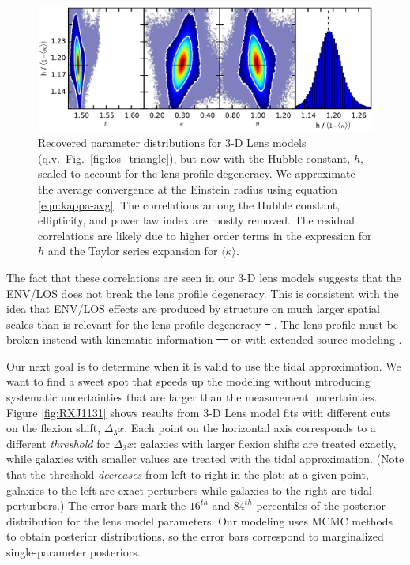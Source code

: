 \documentclass{emulateapj}
\providecommand{\DIFaddtex}[1]{{\protect\color{blue}\uwave{#1}}} %
\providecommand{\DIFdeltex}[1]{{\protect\color{red}\sout{#1}}}                      %
\providecommand{\DIFaddbegin}{} %
\providecommand{\DIFaddend}{} %
\providecommand{\DIFdelbegin}{} %
\providecommand{\DIFdelend}{} %
\providecommand{\DIFadd}[1]{\texorpdfstring{\DIFaddtex{#1}}{#1}} %
\providecommand{\DIFdel}[1]{\texorpdfstring{\DIFdeltex{#1}}{}} %
\begin{document}
\begin{figure}[ht]
\begin{center}
\includegraphics[width=1\textwidth]{los_scaled_h.pdf}
\caption{\label{fig:scaled_triangle} Recovered parameter distributions for 3-D Lens models (q.v.\ Fig.\ \ref{fig:los_triangle}), but now with the Hubble constant, $h$, scaled to account for the lens profile degeneracy.  We approximate the average convergence at the Einstein radius using equation \ref{eqn:kappa-avg}. The correlations among the Hubble constant, ellipticity, and power law index are mostly removed. The residual correlations are likely due to higher order terms in the expression for $h$ \citep{Kochanek02} and the Taylor series expansion for $\langle \kappa \rangle$.%
}
\end{center}
\end{figure}

The fact that these correlations are seen in our 3-D lens models suggests that the ENV/LOS does not break the lens profile degeneracy. This is consistent with the idea that ENV/LOS effects are produced by structure on much larger spatial scales than is relevant for the lens profile degeneracy \DIFdelbegin \DIFdel{\mbox{%
\citep{Xu15,Schneider13}}%
}\DIFdelend \DIFaddbegin \DIFadd{\mbox{%
\citep{Xu16,Schneider13}}%
}\DIFaddend . The lens profile must be broken instead with kinematic information \DIFdelbegin \DIFdel{\mbox{%
\citep[e.g.][]{Suyu13} }%
}\DIFdelend \DIFaddbegin \DIFadd{\mbox{%
\citep[e.g.,][]{Suyu13} }%
}\DIFaddend or with extended source modeling \citep{Suyu12}.

Our next goal is to determine when it is valid to use the tidal approximation.  We want to find a sweet spot that speeds up the modeling without introducing systematic uncertainties that are larger than the measurement uncertainties.  Figure \ref{fig:RXJ1131} shows results from 3-D Lens model fits with different cuts on the flexion shift, $\Delta_3 x$.  Each point on the horizontal axis corresponds to a different \emph{threshold} for $\Delta_3 x$: galaxies with larger flexion shifts are treated exactly, while galaxies with smaller values are treated with the tidal approximation.  (Note that the threshold \emph{decreases} from left to right in the plot; at a given point, galaxies to the left are exact perturbers while galaxies to the right are tidal perturbers.)  The error bars mark the $16^{th}$ and $84^{th}$ percentiles of the posterior distribution for the lens model parameters.  Our modeling uses MCMC methods to obtain posterior distributions, so the error bars correspond to marginalized single-parameter posteriors.
\end{document}
